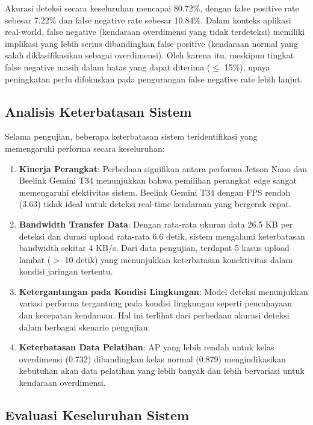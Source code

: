 Akurasi deteksi secara keseluruhan mencapai 80.72\%, dengan false positive rate sebesar 7.22\% dan false negative rate sebesar 10.84\%. Dalam konteks aplikasi real-world, false negative (kendaraan overdimensi yang tidak terdeteksi) memiliki implikasi yang lebih serius dibandingkan false positive (kendaraan normal yang salah diklasifikasikan sebagai overdimensi). Oleh karena itu, meskipun tingkat false negative masih dalam batas yang dapat diterima ($\leq$ 15\%), upaya peningkatan perlu difokuskan pada pengurangan false negative rate lebih lanjut.

\subsection{Analisis Keterbatasan Sistem}

Selama pengujian, beberapa keterbatasan sistem teridentifikasi yang memengaruhi performa secara keseluruhan:

\begin{enumerate}
    \item \textbf{Kinerja Perangkat}: Perbedaan signifikan antara performa Jetson Nano dan Beelink Gemini T34 menunjukkan bahwa pemilihan perangkat edge sangat memengaruhi efektivitas sistem. Beelink Gemini T34 dengan FPS rendah (3.63) tidak ideal untuk deteksi real-time kendaraan yang bergerak cepat.
    
    \item \textbf{Bandwidth Transfer Data}: Dengan rata-rata ukuran data 26.5 KB per deteksi dan durasi upload rata-rata 6.6 detik, sistem mengalami keterbatasan bandwidth sekitar 4 KB/s. Dari data pengujian, terdapat 5 kasus upload lambat ($>$ 10 detik) yang menunjukkan keterbatasan konektivitas dalam kondisi jaringan tertentu.
    
    \item \textbf{Ketergantungan pada Kondisi Lingkungan}: Model deteksi menunjukkan variasi performa tergantung pada kondisi lingkungan seperti pencahayaan dan kecepatan kendaraan. Hal ini terlihat dari perbedaan akurasi deteksi dalam berbagai skenario pengujian.
    
    \item \textbf{Keterbatasan Data Pelatihan}: AP yang lebih rendah untuk kelas overdimensi (0.732) dibandingkan kelas normal (0.879) mengindikasikan kebutuhan akan data pelatihan yang lebih banyak dan lebih bervariasi untuk kendaraan overdimensi.
\end{enumerate}

\subsection{Evaluasi Keseluruhan Sistem}

